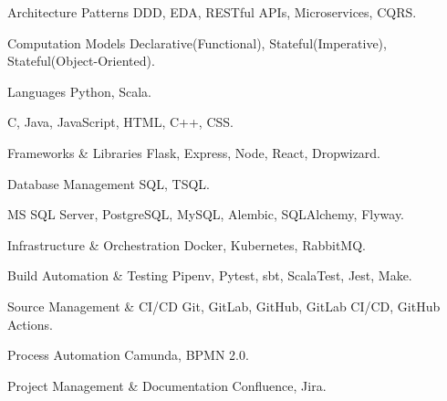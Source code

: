   \begin{cvskills}
    \cvskill
      {Architecture Patterns}
      { DDD, EDA, RESTful APIs, Microservices, CQRS.}

    \cvskill
      {Computation Models}
      { Declarative(Functional), Stateful(Imperative), Stateful(Object-Oriented).}

    \cvskill
      {Languages}
      { Python, Scala.}

    \cvskill
      {}
      { C, Java, JavaScript, HTML, C++, CSS.}

    \cvskill
      {Frameworks \& Libraries}
      { Flask, Express, Node, React, Dropwizard.}

    \cvskill
      {Database Management}
      { SQL, TSQL.}

    \cvskill
      {}
      { MS SQL Server, PostgreSQL, MySQL, Alembic, SQLAlchemy, Flyway.}

    \cvskill
      {Infrastructure \& Orchestration}
      { Docker, Kubernetes, RabbitMQ.}

    \cvskill
      {Build Automation \& Testing}
      { Pipenv, Pytest, sbt, ScalaTest, Jest, Make.}

    \cvskill
      {Source Management \& CI/CD}
      { Git, GitLab, GitHub, GitLab CI/CD, GitHub Actions.}

    \cvskill
      {Process Automation}
      { Camunda, BPMN 2.0.}

    \cvskill
      {Project Management \& Documentation}
      { Confluence, Jira.}
  \end{cvskills}

